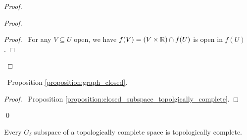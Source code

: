 \begin{proof}
    \pf
    \begin{proof}
        \begin{proof}
            \pf\ For any $V \subseteq U$ open, we have $f(V) = (V \times \mathbb{R}) \cap f(U)$ is open in $f(U)$.
        \end{proof}
    \end{proof}
    \begin{proposition}
        \pf\ Proposition \ref{proposition:graph_closed}.
    \end{proposition}
    \qedstep
    \begin{proof}
        \pf\ Proposition \ref{proposition:closed_subspace_topolgically_complete}.
    \end{proof}
    \qed
\end{proof}

\begin{proposition}
    Every $G_\delta$ subspace of a topologically complete space is topologically complete.
\end{proposition}

